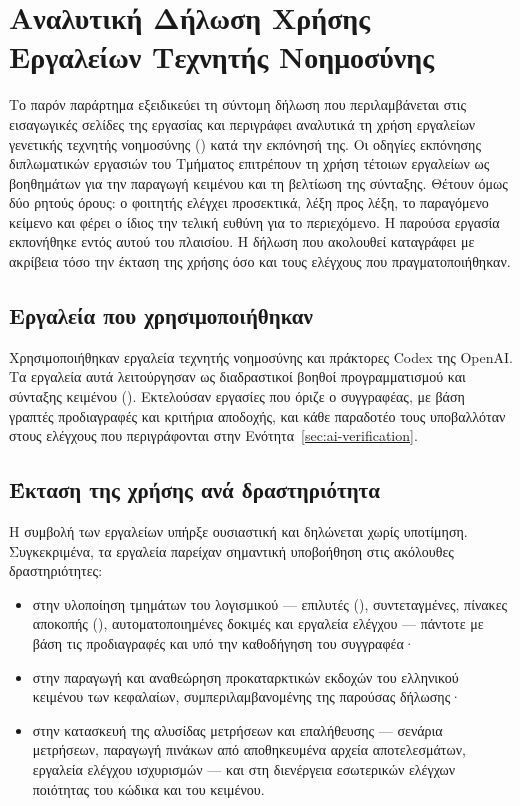 \chapter{Αναλυτική Δήλωση Χρήσης Εργαλείων Τεχνητής Νοημοσύνης}
\label{app:ai}

Το παρόν παράρτημα εξειδικεύει τη σύντομη δήλωση που περιλαμβάνεται στις εισαγωγικές σελίδες της εργασίας και περιγράφει αναλυτικά τη χρήση εργαλείων γενετικής τεχνητής νοημοσύνης () κατά την εκπόνησή της. Οι οδηγίες εκπόνησης διπλωματικών εργασιών του Τμήματος επιτρέπουν τη χρήση τέτοιων εργαλείων ως βοηθημάτων για την παραγωγή κειμένου και τη βελτίωση της σύνταξης. Θέτουν όμως δύο ρητούς όρους: ο φοιτητής ελέγχει προσεκτικά, λέξη προς λέξη, το παραγόμενο κείμενο και φέρει ο ίδιος την τελική ευθύνη για το περιεχόμενο. Η παρούσα εργασία εκπονήθηκε εντός αυτού του πλαισίου. Η δήλωση που ακολουθεί καταγράφει με ακρίβεια τόσο την έκταση της χρήσης όσο και τους ελέγχους που πραγματοποιήθηκαν.

\section{Εργαλεία που χρησιμοποιήθηκαν}
\label{sec:ai-tools}

Χρησιμοποιήθηκαν εργαλεία τεχνητής νοημοσύνης και πράκτορες Codex της OpenAI. Τα εργαλεία αυτά λειτούργησαν ως διαδραστικοί βοηθοί προγραμματισμού και σύνταξης κειμένου (). Εκτελούσαν εργασίες που όριζε ο συγγραφέας, με βάση γραπτές προδιαγραφές και κριτήρια αποδοχής, και κάθε παραδοτέο τους υποβαλλόταν στους ελέγχους που περιγράφονται στην Ενότητα~\ref{sec:ai-verification}.

\section{Έκταση της χρήσης ανά δραστηριότητα}
\label{sec:ai-scope}

Η συμβολή των εργαλείων υπήρξε ουσιαστική και δηλώνεται χωρίς υποτίμηση. Συγκεκριμένα, τα εργαλεία παρείχαν σημαντική υποβοήθηση στις ακόλουθες δραστηριότητες:
\begin{itemize}
  \item στην υλοποίηση τμημάτων του λογισμικού — επιλυτές (), συντεταγμένες, πίνακες αποκοπής (), αυτοματοποιημένες δοκιμές και εργαλεία ελέγχου — πάντοτε με βάση τις προδιαγραφές και υπό την καθοδήγηση του συγγραφέα·
  \item στην παραγωγή και αναθεώρηση προκαταρκτικών εκδοχών του ελληνικού κειμένου των κεφαλαίων, συμπεριλαμβανομένης της παρούσας δήλωσης·
  \item στην κατασκευή της αλυσίδας μετρήσεων και επαλήθευσης — σενάρια μετρήσεων, παραγωγή πινάκων από αποθηκευμένα αρχεία αποτελεσμάτων, εργαλεία ελέγχου ισχυρισμών — και στη διενέργεια εσωτερικών ελέγχων ποιότητας του κώδικα και του κειμένου.
\end{itemize}

